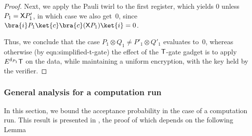 \documentclass{toc}
\newcommand{\tgate}{{\sf T}}
\newcommand{\xgate}{{\sf X}}
\newcommand{\ketbra}[2]{\ket{#1}\bra{#2}}			%
\begin{document}
\begin{proof}
Next, 
we
%
 apply 
 the 
 Pauli twirl to the first register, which yields $0$ unless $P_1 = \xgate P'_1$, in which case we also get~$0$,
since $ \bra{i} P_1  \ketbra{c}{c}  (\xgate {P_1})  \ket{i}=0 $.


Thus, we conclude that the case $P_1\otimes Q_1 \neq P'_1 \otimes Q'_1$ evaluates to~$0$, whereas otherwise (by  {eqn:simplified-t-gate}) the effect of the $\tgate$-gate gadget is to apply $E^{\delta_{P_1}} \tgate$ on the data, while maintaining a uniform encryption, with the key held by the verifier.
\end{proof}




\subsubsection{General analysis for a computation run}
\label{sec:soundness-computation-general}


In this section, we  bound the acceptance probability in the case of a computation run. %
%
  This result is presented in , the proof of which depends on the following Lemma%
\end{document}
